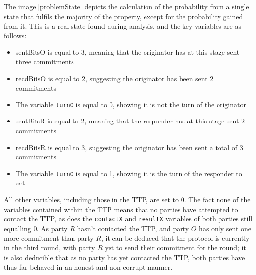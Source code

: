 \documentclass{l4proj}
\begin{document}
The image \ref{problemState} depicts the calculation of the probability from a single state that fulfils the majority of the property, except for the probability gained from it. This is a real state found during analysis, and the key variables are as follows:
\begin{itemize}
\item sentBitsO is equal to 3, meaning that the originator has at this stage sent three commitments
\item recdBitsO is equal to 2, suggesting the originator has been sent 2 commitments
\item The variable {\tt turnO} is equal to 0, showing it is not the turn of the originator
\item sentBitsR is equal to 2, meaning that the responder has at this stage sent 2 commitments
\item recdBitsR is equal to 3, suggesting the originator has been sent a total of 3 commitments
\item The variable {\tt turnO} is equal to 1, showing it is the turn of the responder to act
\end{itemize}

All other variables, including those in the TTP, are set to 0. The fact none of the variables contained within the TTP means that no parties have attempted to contact the TTP, as does the {\tt contactX} and {\tt resultX} variables of both parties still equalling 0. As party $R$ hasn't contacted the TTP, and party $O$ has only sent one more commitment than party $R$, it can be deduced that the protocol is currently in the third round, with party $R$ yet to send their commitment for the round; it is also deducible that as no party has yet contacted the TTP, both parties have thus far behaved in an honest and non-corrupt manner.
\end{document}
